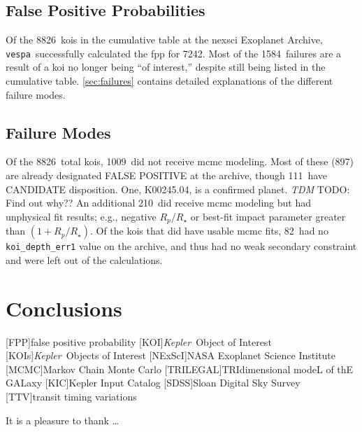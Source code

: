 \documentclass{emulateapj}
\newcommand{\ntotal}{8826}
\newcommand{\nfail}{1584}
\newcommand{\ncalc}{7242}
\newcommand{\nbadphot}{1009} %
\newcommand{\nbadphotFP}{897}
\newcommand{\nbadphotCAND}{111}
\newcommand{\nbadrowemcmc}{210}
\newcommand{\nbadsec}{82} %
\newcommand{\kepler}{\textit{Kepler}}
\newcommand{\vespa}{\texttt{vespa}}
\newcommand{\todo}[3]{{\color{#2} \emph{#1} TODO: #3}}
\newcommand{\tdmtodo}[1]{\todo{TDM}{red}{#1}}
\begin{document}

\subsection{False Positive Probabilities}
\label{sec:results:fpp}

Of the \ntotal\ \acp{koi} in the cumulative
table at the \ac{nexsci} Exoplanet Archive, \vespa\ successfully
calculated the \ac{fpp} for \ncalc.  Most of the \nfail\ failures are a
result of a \ac{koi} no longer being ``of interest,'' despite still
being listed in the cumulative table.  \autoref{sec:failures} contains
detailed explanations of the different failure modes.




\subsection{Failure Modes}
\label{sec:failures}


Of the \ntotal\ total \acp{koi}, \nbadphot\ did not receive \ac{mcmc}
modeling.  Most of these (\nbadphotFP) are already designated FALSE
POSITIVE at the archive, though \nbadphotCAND\ have CANDIDATE
disposition.  One, K00245.04, is a confirmed planet.  \tdmtodo{Find
  out why??}  An additional \nbadrowemcmc\ did receive \ac{mcmc}
modeling but had unphysical fit results; e.g., negative $R_p/R_\star$
or best-fit impact parameter greater than $(1 + R_p/R_\star)$.  Of the
\acp{koi} that did have usable \ac{mcmc} fits, \nbadsec\ had no
\verb|koi_depth_err1| value on the archive, and thus had no weak
secondary constraint and were left out of the calculations.



\section{Conclusions}
\label{sec:conclusions}

[FPP]{false positive probability}
[KOI]{\kepler\ Object of Interest}
[KOIs]{\kepler\ Objects of Interest}
[NExScI]{NASA Exoplanet Science Institute}
[MCMC]{Markov Chain Monte Carlo}
[TRILEGAL]{TRIdimensional modeL of thE GALaxy}
[KIC]{Kepler Input Catalog}
[SDSS]{Sloan Digital Sky Survey}
[TTV]{transit timing variations}


\acknowledgments
It is a pleasure to thank
\ldots\

\clearpage

\clearpage




\end{document}
